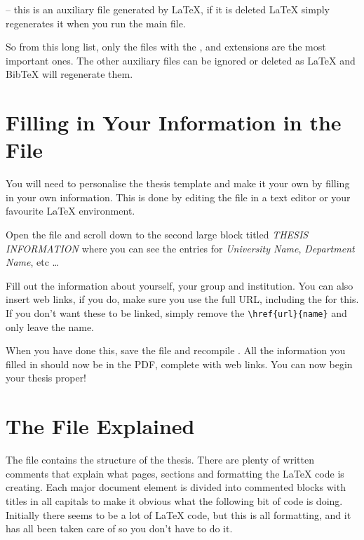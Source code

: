  -- this is an auxiliary file generated by \LaTeX{}, if it is deleted \LaTeX{} simply regenerates it when you run the main  file.

So from this long list, only the files with the ,  and  extensions are the most important ones. The other auxiliary files can be ignored or deleted as \LaTeX{} and BibTeX will regenerate them.


\section{Filling in Your Information in the  File}\label{FillingFile}

You will need to personalise the thesis template and make it your own by filling in your own information. This is done by editing the  file in a text editor or your favourite LaTeX environment.

Open the file and scroll down to the second large block titled \emph{THESIS INFORMATION} where you can see the entries for \emph{University Name}, \emph{Department Name}, etc \ldots

Fill out the information about yourself, your group and institution. You can also insert web links, if you do, make sure you use the full URL, including the  for this. If you don't want these to be linked, simply remove the \verb|\href{url}{name}| and only leave the name.

When you have done this, save the file and recompile . All the information you filled in should now be in the PDF, complete with web links. You can now begin your thesis proper!


\section{The  File Explained}

The  file contains the structure of the thesis. There are plenty of written comments that explain what pages, sections and formatting the \LaTeX{} code is creating. Each major document element is divided into commented blocks with titles in all capitals to make it obvious what the following bit of code is doing. Initially there seems to be a lot of \LaTeX{} code, but this is all formatting, and it has all been taken care of so you don't have to do it.

